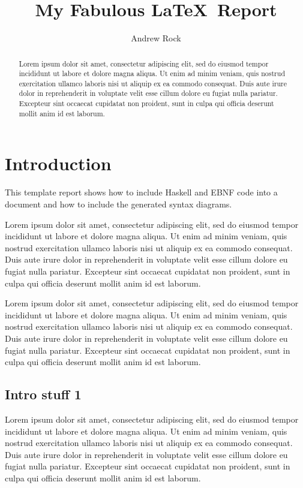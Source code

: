 \documentclass[a4paper]{article}
\begin{document}
\title{My Fabulous \LaTeX\ Report}

\author{Andrew Rock}

\maketitle

\begin{abstract}
   Lorem ipsum dolor sit amet, consectetur adipiscing elit, sed do eiusmod
   tempor incididunt ut labore et dolore magna aliqua. Ut enim ad minim
   veniam, quis nostrud exercitation ullamco laboris nisi ut aliquip ex ea
   commodo consequat. Duis aute irure dolor in reprehenderit in voluptate
   velit esse cillum dolore eu fugiat nulla pariatur. Excepteur sint occaecat
   cupidatat non proident, sunt in culpa qui officia deserunt mollit anim id
   est laborum.
\end{abstract}

\section{Introduction}

This template report shows how to include Haskell and EBNF code into a document
and how to include the generated syntax diagrams. 

Lorem ipsum dolor sit amet, consectetur adipiscing elit, sed do eiusmod
tempor incididunt ut labore et dolore magna aliqua. Ut enim ad minim
veniam, quis nostrud exercitation ullamco laboris nisi ut aliquip ex ea
commodo consequat. Duis aute irure dolor in reprehenderit in voluptate
velit esse cillum dolore eu fugiat nulla pariatur. Excepteur sint occaecat
cupidatat non proident, sunt in culpa qui officia deserunt mollit anim id
est laborum.

Lorem ipsum dolor sit amet, consectetur adipiscing elit, sed do eiusmod
tempor incididunt ut labore et dolore magna aliqua. Ut enim ad minim
veniam, quis nostrud exercitation ullamco laboris nisi ut aliquip ex ea
commodo consequat. Duis aute irure dolor in reprehenderit in voluptate
velit esse cillum dolore eu fugiat nulla pariatur. Excepteur sint occaecat
cupidatat non proident, sunt in culpa qui officia deserunt mollit anim id
est laborum.


\subsection{Intro stuff 1}

Lorem ipsum dolor sit amet, consectetur adipiscing elit, sed do eiusmod
tempor incididunt ut labore et dolore magna aliqua. Ut enim ad minim
veniam, quis nostrud exercitation ullamco laboris nisi ut aliquip ex ea
commodo consequat. Duis aute irure dolor in reprehenderit in voluptate
velit esse cillum dolore eu fugiat nulla pariatur. Excepteur sint occaecat
cupidatat non proident, sunt in culpa qui officia deserunt mollit anim id
est laborum.
\end{document}
